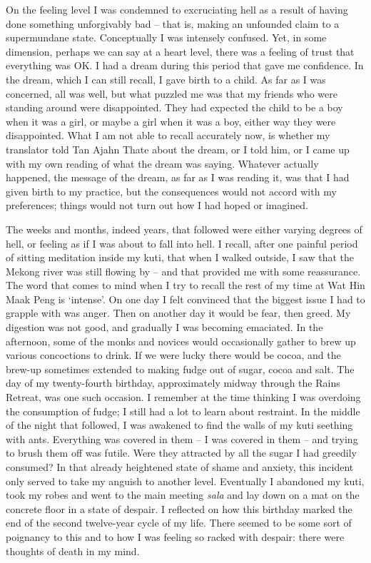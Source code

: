 On the feeling level I was condemned to excruciating hell as a result of
having done something unforgivably bad -- that is, making an unfounded
claim to a supermundane state. Conceptually I was intensely confused.
Yet, in some dimension, perhaps we can say at a heart level, there was a
feeling of trust that everything was OK. I had a dream during this
period that gave me confidence. In the dream, which I can still recall,
I gave birth to a child. As far as I was concerned, all was well, but
what puzzled me was that my friends who were standing around were
disappointed. They had expected the child to be a boy when it was a
girl, or maybe a girl when it was a boy, either way they were
disappointed. What I am not able to recall accurately now, is whether my
translator told Tan Ajahn Thate about the dream, or I told him, or I
came up with my own reading of what the dream was saying. Whatever
actually happened, the message of the dream, as far as I was reading it,
was that I had given birth to my practice, but the consequences would
not accord with my preferences; things would not turn out how I had
hoped or imagined.

The weeks and months, indeed years, that followed were either varying
degrees of hell, or feeling as if I was about to fall into hell. I
recall, after one painful period of sitting meditation inside my kuti,
that when I walked outside, I saw that the Mekong river was still
flowing by -- and that provided me with some reassurance. The word that
comes to mind when I try to recall the rest of my time at Wat Hin Maak
Peng is `intense'. On one day I felt convinced that the biggest issue I
had to grapple with was anger. Then on another day it would be fear,
then greed. My digestion was not good, and gradually I was becoming
emaciated. In the afternoon, some of the monks and novices would
occasionally gather to brew up various concoctions to drink. If we were
lucky there would be cocoa, and the brew-up sometimes extended to making
fudge out of sugar, cocoa and salt. The day of my twenty-fourth
birthday, approximately midway through the Rains Retreat, was one such
occasion. I remember at the time thinking I was overdoing the
consumption of fudge; I still had a lot to learn about restraint. In the
middle of the night that followed, I was awakened to find the walls of
my kuti seething with ants. Everything was covered in them -- I was
covered in them -- and trying to brush them off was futile. Were they
attracted by all the sugar I had greedily consumed? In that already
heightened state of shame and anxiety, this incident only served to take
my anguish to another level. Eventually I abandoned my kuti, took my
robes and went to the main meeting \emph{sala} and lay down on a mat on
the concrete floor in a state of despair. I reflected on how this
birthday marked the end of the second twelve-year cycle of my life.
There seemed to be some sort of poignancy to this and to how I was
feeling so racked with despair: there were thoughts of death in my mind.

